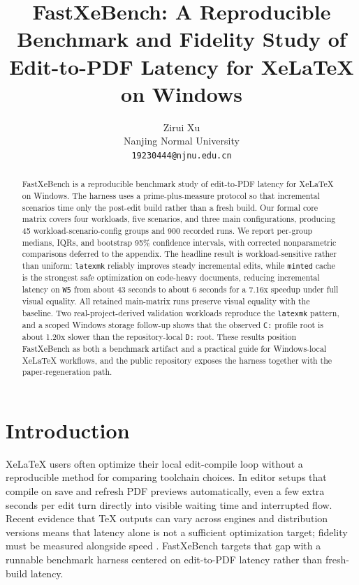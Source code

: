 \documentclass[11pt]{article}
\title{FastXeBench: A Reproducible Benchmark and Fidelity Study of Edit-to-PDF Latency for XeLaTeX on Windows}
\author{Zirui Xu\\Nanjing Normal University\\\texttt{19230444@njnu.edu.cn}}
\date{}
\begin{document}
\maketitle

\begin{abstract}
FastXeBench is a reproducible benchmark study of edit-to-PDF latency for XeLaTeX on Windows. The harness uses a prime-plus-measure protocol so that incremental scenarios time only the post-edit build rather than a fresh build. Our formal core matrix covers four workloads, five scenarios, and three main configurations, producing 45 workload-scenario-config groups and 900 recorded runs. We report per-group medians, IQRs, and bootstrap 95\% confidence intervals, with corrected nonparametric comparisons deferred to the appendix. The headline result is workload-sensitive rather than uniform: \texttt{latexmk} reliably improves steady incremental edits, while \texttt{minted} cache is the strongest safe optimization on code-heavy documents, reducing incremental latency on \texttt{W5} from about 43 seconds to about 6 seconds for a 7.16x speedup under full visual equality. All retained main-matrix runs preserve visual equality with the baseline. Two real-project-derived validation workloads reproduce the \texttt{latexmk} pattern, and a scoped Windows storage follow-up shows that the observed \texttt{C:} profile root is about 1.20x slower than the repository-local \texttt{D:} root. These results position FastXeBench as both a benchmark artifact and a practical guide for Windows-local XeLaTeX workflows, and the public repository exposes the harness together with the paper-regeneration path.
\end{abstract}

\section{Introduction}
XeLaTeX users often optimize their local edit-compile loop without a reproducible method for comparing toolchain choices. In editor setups that compile on save and refresh PDF previews automatically, even a few extra seconds per edit turn directly into visible waiting time and interrupted flow. Recent evidence that TeX outputs can vary across engines and distribution versions means that latency alone is not a sufficient optimization target; fidelity must be measured alongside speed \cite{tan2024tex}. FastXeBench targets that gap with a runnable benchmark harness centered on edit-to-PDF latency rather than fresh-build latency.
\end{document}
